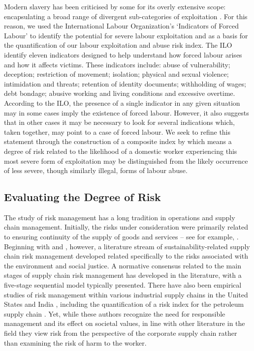 \documentclass[
  12pt,
  letterpaper,
  DIV=11,
  numbers=noendperiod]{scrartcl}
\theoremstyle{plain}
\theoremstyle{definition}
\begin{document}
Modern slavery has been criticised by some for its overly extensive
scope: encapsulating a broad range of divergent sub-categories of
exploitation
\autocite{oconnell_davidson_margins_2015,gutierrez-huerter_o_change_2023}.
For this reason, we used the International Labour Organization's
\autocite{ILO11-indicators} `Indicators of Forced Labour' to identify
the potential for severe labour exploitation and as a basis for the
quantification of our labour exploitation and abuse risk index. The ILO
identify eleven indicators designed to help understand how forced labour
arises and how it affects victims. These indicators include: abuse of
vulnerability; deception; restriction of movement; isolation; physical
and sexual violence; intimidation and threats; retention of identity
documents; withholding of wages; debt bondage; abusive working and
living conditions and excessive overtime. According to the ILO, the
presence of a single indicator in any given situation may in some cases
imply the existence of forced labour. However, it also suggests that in
other cases it may be necessary to look for several indications which,
taken together, may point to a case of forced labour. We seek to refine
this statement through the construction of a composite index by which
means a degree of risk related to the likelihood of a domestic worker
experiencing this most severe form of exploitation may be distinguished
from the likely occurrence of less severe, though similarly illegal,
forms of labour abuse.

\subsection{Evaluating the Degree of
Risk}\label{evaluating-the-degree-of-risk}

The study of risk management has a long tradition in operations and
supply chain management. Initially, the risks under consideration were
primarily related to ensuring continuity of the supply of goods and
services -- see for example, \textcite{juttner_supply_2003}. Beginning
with \textcite{anderson_critical_2006} and
\textcite{anderson_sustainability_2009}, however, a literature stream of
sustainability-related supply chain risk management developed related
specifically to the risks associated with the environment and social
justice. A normative consensus related to the main stages of supply
chain risk management has developed in the literature, with a five-stage
sequential model typically presented. There have also been empirical
studies of risk management within various industrial supply chains in
the United States and India
\autocite{tarei_hybrid_2018,dellana_scale_2021}, including the
quantification of a risk index for the petroleum supply chain
\autocite{tarei_hybrid_2018}. Yet, while these authors recognize the
need for responsible management and its effect on societal values, in
line with other literature in the field they view risk from the
perspective of the corporate supply chain rather than examining the risk
of harm to the worker.
\end{document}
